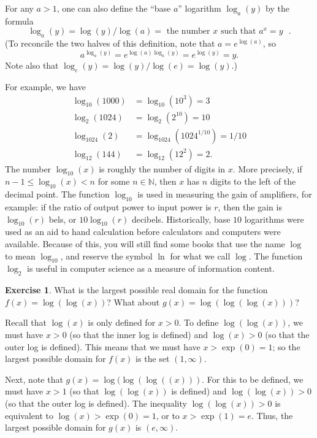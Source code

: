 \documentclass[a4paper]{book}
\newcommand{\N}         {{\mathbb{N}}}
\renewcommand{\:}{\colon}
\theoremstyle{definition}
\newtheorem{exercise}[theorem]{Exercise}
\renewenvironment{solution}{\SolutionInline}{\endSolutionInline}
\begin{document}
For any $a>1$, one can also define the ``base $a$'' logarithm
$\log_a(y)$ by the formula
\[ \log_a(y) = \log(y)/\log(a) =
    \text{ the number $x$ such that $a^x=y$ }.
\]
(To reconcile the two halves of this definition, note that
$a=e^{\log(a)}$, so
\[ a^{\log_a(y)} = e^{\log(a)\log_a(y)} = e^{\log(y)} = y. \]
Note also that $\log_e(y)=\log(y)/\log(e)=\log(y)$.)

For example, we have
\begin{align*}
 \log_{10}(1000) &= \log_{10}(10^3) = 3 \\
 \log_2(1024)    &= \log_2(2^{10}) = 10 \\
 \log_{1024}(2)  &= \log_{1024}(1024^{1/10}) = 1/10 \\
 \log_{12}(144)  &= \log_{12}(12^2) = 2.
\end{align*}
The number $\log_{10}(x)$ is roughly the number of digits in $x$.
More precisely, if $n-1\leq\log_{10}(x)<n$ for some $n\in\N$, then $x$
has $n$ digits to the left of the decimal point.  The function
$\log_{10}$ is used in measuring the gain of amplifiers, for example:
if the ratio of output power to input power is $r$, then the gain is
$\log_{10}(r)$ bels, or $10\log_{10}(r)$ decibels.  Historically, base
$10$ logarithms were used as an aid to hand calculation before
calculators and computers were available.  Because of this, you will
still find some books that use the name $\log$ to mean $\log_{10}$,
and reserve the symbol $\ln$ for what we call $\log$.  The function
$\log_2$ is useful in computer science as a measure of information
content.

\begin{exercise}
 What is the largest possible real domain for the function
 $f(x)=\log(\log(x))$?  What about $g(x)=\log(\log(\log(x)))$?
\end{exercise}
\begin{solution}
 Recall that $\log(x)$ is only defined for $x>0$.  To define
 $\log(\log(x))$, we must have $x>0$ (so that the inner log is
 defined) and $\log(x)>0$ (so that the outer log is defined).  This
 means that we must have $x>\exp(0)=1$; so the largest possible domain
 for $f(x)$ is the set $(1,\infty)$.  
 
 Next, note that $g(x)=\log(\log(\log((x)))$.  For this to be defined,
 we must have $x>1$ (so that $\log(\log(x))$ is defined) and
 $\log(\log(x))>0$ (so that the outer log is defined).  The inequality
 $\log(\log(x))>0$ is equivalent to $\log(x)>\exp(0)=1$, or to
 $x>\exp(1)=e$.  Thus, the largest possible domain for $g(x)$ is
 $(e,\infty)$. 
\end{solution}
\end{document}
